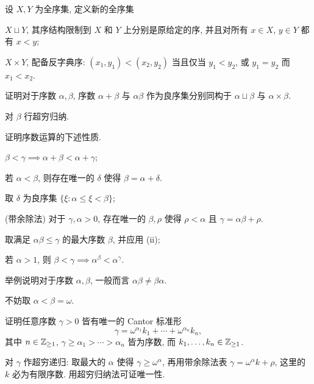 \begin{Exercises}
	\item 设 $X, Y$ 为全序集, 定义新的全序集
		\begin{compactenum}[(i)]
			\item $X \sqcup Y$, 其序结构限制到 $X$ 和 $Y$ 上分别是原给定的序, 并且对所有 $x \in X$, $y \in Y$ 都有 $x < y$;
			\item $X \times Y$, 配备反字典序: $(x_1, y_1) < (x_2, y_2)$ 当且仅当 $y_1 < y_2$, 或 $y_1=y_2$ 而 $x_1 < x_2$.
		\end{compactenum}
		证明对于序数 $\alpha, \beta$, 序数 $\alpha + \beta$ 与 $\alpha \beta$ 作为良序集分别同构于 $\alpha \sqcup \beta$ 与 $\alpha \times \beta$.
		\begin{hint} 对 $\beta$ 行超穷归纳. \end{hint}
	\item 证明序数运算的下述性质.
		\begin{compactenum}[(i)]
			\item $\beta < \gamma \implies \alpha + \beta < \alpha + \gamma$;
			\item 若 $\alpha < \beta$, 则存在唯一的 $\delta$ 使得 $\beta = \alpha + \delta$. \begin{hint} 取 $\delta$ 为良序集 $\{\xi : \alpha \leq \xi < \beta \}$;\end{hint}
			\item (带余除法) 对于 $\gamma, \alpha > 0$, 存在唯一的 $\beta, \rho$ 使得 $\rho < \alpha$ 且 $\gamma = \alpha \beta + \rho$. \begin{hint}取满足 $\alpha\beta \leq \gamma$ 的最大序数 $\beta$, 并应用 (ii); \end{hint}
			\item 若 $\alpha > 1$, 则 $\beta < \gamma \implies \alpha^\beta < \alpha^\gamma$.
		\end{compactenum}
	\item 举例说明对于序数 $\alpha, \beta$, 一般而言 $\alpha \beta \neq \beta \alpha$. \begin{hint}不妨取 $\alpha < \beta = \omega$.\end{hint}
	\item 证明任意序数 $\gamma > 0$ 皆有唯一的 Cantor 标准形
		\[ \gamma= \omega^{\alpha_1} k_1 + \cdots + \omega^{\alpha_n} k_n, \]
		其中 $n \in \mathbb{Z}_{\geq 1}$, $\gamma \geq \alpha_1 > \cdots > \alpha_n$ 皆为序数, 而 $k_1, \ldots, k_n \in \mathbb{Z}_{\geq 1}$. \begin{hint}对 $\gamma$ 作超穷递归: 取最大的 $\alpha$ 使得 $\gamma \geq \omega^\alpha $, 再用带余除法表 $\gamma = \omega^\alpha k + \rho$, 这里的 $k$ 必为有限序数. 用超穷归纳法可证唯一性.\end{hint}

\end{Exercises}
